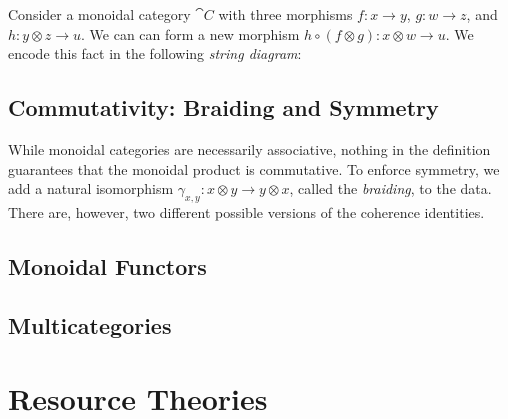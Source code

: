 Consider a monoidal category $\cat{C}$ with three morphisms $f: x\to y$, $g:
w\to z$, and $h: y\otimes z\to u$. We can can form a new morphism $h\circ
(f\otimes g): x\otimes w\to u$. We encode this fact in the following
\emph{string diagram}: \[
\]

\subsection{Commutativity: Braiding and Symmetry}

While monoidal categories are necessarily associative, nothing in the definition
guarantees that the monoidal product is commutative. To enforce symmetry, we add
a natural isomorphism $\gamma_{x,y}: x\otimes y\to y\otimes x$, called the
\emph{braiding}, to the data. There are, however, two different possible
versions of the coherence identities.

\subsection{Monoidal Functors}

\subsection{Multicategories}

\section{Resource Theories}
